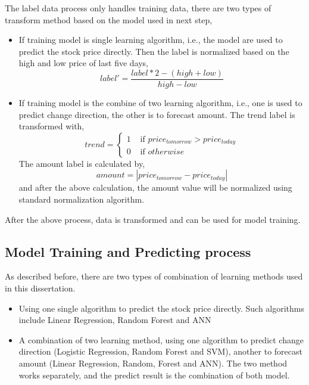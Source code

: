 The label data process only handles training data, there are two types of transform method based on the model used in next step,
\begin{itemize}
	\item If training model is single learning algorithm, i.e., the model are used to predict the stock price directly. Then the label is normalized based on the high and low price of last five days,
	\begin{equation}
	label'=\frac{label*2-(high + low)}{high - low}
	\end{equation}
	\item If training model is the combine of two learning algorithm, i.e., one is used to predict change direction, the other is to forecast amount. The trend label is transformed with,
	\begin{equation}
	trend=\begin{cases}
	1 & \text{ if } price_{tomorrow} > price_{today} \\ 
	0 & \text{ if } otherwise
	\end{cases}
	\end{equation}
	The amount label is calculated by,
	\begin{equation}
	amount=\left | price_{tomorrow} - price_{today} \right |
	\end{equation}
	and after the above calculation, the amount value will be normalized using standard normalization algorithm. 
\end{itemize}

After the above process, data is transformed and can be used for model training.

\subsection{Model Training and Predicting process}
As described before, there are two types of combination of learning methods used in this dissertation. 
\begin{itemize}
	\item Using one single algorithm to predict the stock price directly. Such algorithms include Linear Regression, Random Forest and ANN
	\item A combination of two learning method, using one algorithm to predict change direction (Logistic Regression, Random Forest and SVM), another to forecast amount (Linear Regression, Random, Forest and ANN). The two method works separately, and the predict result is the combination of both model.
\end{itemize}
